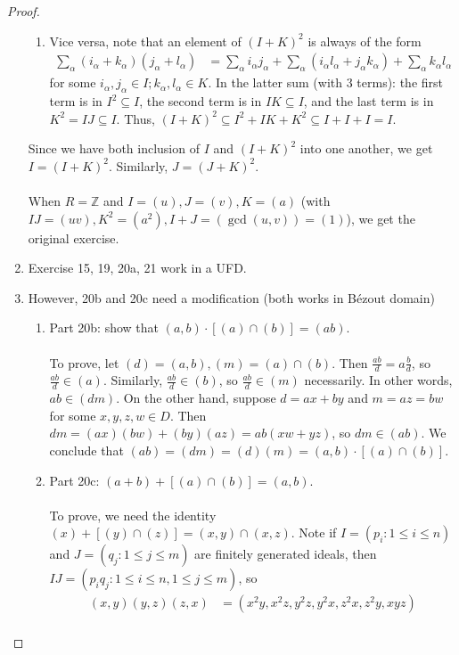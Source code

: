 \documentclass{article}
\theoremstyle{definition}
\begin{document}
\begin{proof}
\begin{enumerate}
\begin{enumerate}
		\item Vice versa, note that an element of $(I + K)^2$ is always of the form
		\begin{align*}
		\sum_\alpha (i_\alpha + k_\alpha) (j_\alpha + l_\alpha) & = \sum_\alpha i_\alpha j_\alpha + \sum_\alpha (i_\alpha l_\alpha + j_\alpha k_\alpha) + \sum_\alpha k_\alpha l_\alpha
		\end{align*}
		for some $i_\alpha, j_\alpha \in I; k_\alpha, l_\alpha \in K$. In the latter sum (with 3 terms): the first term is in $I^2 \subseteq I$, the second term is in $IK \subseteq I$, and the last term is in $K^2 = IJ \subseteq I$. Thus, $(I + K)^2 \subseteq I^2 + IK + K^2 \subseteq I + I + I = I$.
	\end{enumerate}
	Since we have both inclusion of $I$ and $(I + K)^2$ into one another, we get $I = (I + K)^2$. Similarly, $J = (J + K)^2$.
	\\
	\\
	When $R = \mathbb{Z}$ and $I = (u), J = (v), K = (a)$ (with $IJ = (uv), K^2 = (a^2), I + J = (\gcd(u, v)) = (1)$), we get the original exercise.
	\item Exercise 15, 19, 20a, 21 work in a UFD.
	\item However, 20b and 20c need a modification (both works in Bézout domain)
	\begin{enumerate}
		\item Part 20b: show that $(a, b) \cdot [(a) \cap (b)] = (ab)$.
		\\
		\\
		To prove, let $(d) = (a, b), (m) = (a) \cap (b)$. Then $\frac{ab}{d} = a \frac{b}{d}$, so $\frac{ab}{d} \in (a)$. Similarly, $\frac{ab}{d} \in (b)$, so $\frac{ab}{d} \in (m)$ necessarily. In other words, $ab \in (dm)$. On the other hand, suppose $d = ax + by$ and $m = az = bw$ for some $x, y, z, w \in D$. Then $dm = (ax)(bw) + (by)(az) = ab(xw + yz)$, so $dm \in (ab)$. We conclude that $(ab) = (dm) = (d) (m) = (a, b) \cdot [(a) \cap (b)]$.
		\item Part 20c: $(a + b) + [(a) \cap (b)] = (a, b)$.
		\\
		\\
		To prove, we need the identity $(x) + [(y) \cap (z)] = (x, y) \cap (x, z)$. Note if $I = (p_i : 1 \leq i \leq n)$ and $J = (q_j : 1 \leq j \leq m)$ are finitely generated ideals, then $IJ = (p_i q_j : 1 \leq i \leq n, 1 \leq j \leq m)$, so 
		\begin{align*}
		(x, y) (y, z) (z, x) & = (x^2 y, x^2 z, y^2 z, y^2 x, z^2 x, z^2 y, xyz) \\

\end{align*}
\end{enumerate}
\end{enumerate}
\end{proof}
\end{document}
